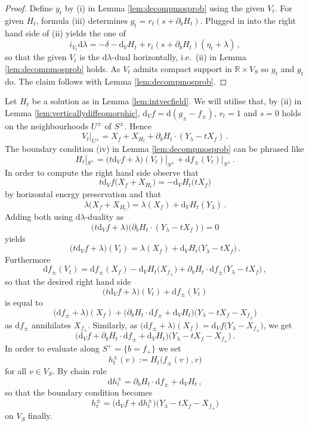 \documentclass{amsart}
\theoremstyle{definition}
\newcommand{\rmd}{\mathrm d}
\newcommand{\R}{\mathbb R}
\begin{document}
\begin{proof}
  Define $y_t$ by (i) in Lemma \ref{lem:decompmosprob}
  using the given $V_t$.
  For given $H_t$,
  formula (iii) determines $g_t=r_t(s+\partial_bH_t)$.
  Plugged in into the right hand side of (ii) yields
  the one of
  \[
    i_{V_t}\rmd\lambda=
    -\delta-\rmd_V\!H_t+r_t(s+\partial_bH_t)(\eta_t+\lambda)
    \,,
  \]
  so that the given $V_t$ is the $\rmd\lambda$-dual horizontally,
  i.e.\ (ii) in Lemma \ref{lem:decompmosprob} holds.
  As $V_t$ admits compact support in $\R\times V_S$
  so $y_t$ and $g_t$ do.
  The claim follows with Lemma \ref{lem:decompmosprob}.
\end{proof}


Let $H_t$ be a solution as in Lemma \ref{lem:intvecfield}.
We will utilise that, by (ii) in Lemma \ref{lem:verticallydiffeomorphic},
$\rmd_V\!f=\rmd(g_{\pm}-f_{\pm})$, $r_t=1$ and $s=0$ holds
on the neighbourhoods $U^{\pm}\!$ of $S^{\pm}$.
Hence
  \[
    V_t|_{U^{\pm}}=
    X_f+
    X_{H_t}+
    \partial_bH_t\cdot(Y_{\lambda}-tX_f)
    \,.
  \]
The boundary condition (iv) in Lemma \ref{lem:decompmosprob}
can be phrased like
  \[
    H_t|_{S^{\pm}}=
    \big(t\rmd_V\!f+\lambda\big)(V_t)|_{S^{\pm}}+
    \rmd f_{\pm}(V_t)|_{S^{\pm}}
    \,.
  \]
In order to compute the right hand side observe that
  \[
    t\rmd_V\!f
    \big(X_f+X_{H_t}\big)=
    -\rmd_V\!H_t\big(tX_f\big)
  \]
by horizontal energy preservation and that
  \[
    \lambda
    \big(X_f+X_{H_t}\big)=
    \lambda(X_f)+
    \rmd_V\!H_t(Y_{\lambda})
    \,.
  \]
Adding both using $\rmd\lambda$-duality as
  \[
    \big(t\rmd_V\!f+\lambda\big)
    \big(\partial_bH_t\cdot(Y_{\lambda}-tX_f)\big)
    =0
  \]
yields
  \[
    \big(t\rmd_V\!f+\lambda\big)(V_t)=
    \lambda(X_f)+\rmd_V\!H_t\big(Y_{\lambda}-tX_f\big)
    \,.
  \]
Furthermore
  \[
    \rmd f_{\pm}(V_t)=
    \rmd f_{\pm}(X_f)-
    \rmd_V\!H_t\big(X_{f_{\pm}}\big)+
    \partial_bH_t\cdot\rmd f_{\pm}\big(Y_{\lambda}-tX_f\big)
    \,,
  \]
so that the desired right hand side
  \[
    \big(t\rmd_V\!f+\lambda\big)(V_t)+
    \rmd f_{\pm}(V_t)
  \]
is equal to
  \[
    \big(\rmd f_{\pm}+\lambda\big)(X_f)+
    \big(\partial_bH_t\cdot\rmd f_{\pm}+\rmd_V\!H_t\big)
    \big(Y_{\lambda}-tX_f-X_{f_{\pm}}\big)
  \]
as $\rmd f_{\pm}$ annihilates $X_{f_{\pm}}$.
Similarly, as
$\big(\rmd f_{\pm}+\lambda\big)(X_f)=
\rmd_V\!f\big(Y_{\lambda}-X_{f_{\pm}}\big)$,
we get
  \[
    \big(\rmd_V\!f+\partial_bH_t\cdot\rmd f_{\pm}+\rmd_V\!H_t\big)
    \big(Y_{\lambda}-tX_f-X_{f_{\pm}}\big)
    \,.
  \]
In order to evaluate along $S^+=\{b=f_+\}$ we set
  \[
    h_t^{\pm}(v):=H_t\big(f_{\pm}(v),v\big)
  \]
for all $v\in V_S$.
By chain rule
  \[
    \rmd h_t^{\pm}=\partial_bH_t\cdot\rmd f_{\pm}+\rmd_V\!H_t
    \,,
  \]
so that the boundary condition becomes
  \[
    h_t^{\pm}=
    \big(\rmd_V\!f+\rmd h_t^{\pm}\big)
    \big(Y_{\lambda}-tX_f-X_{f_{\pm}}\big)
  \]
on $V_S$ finally.
\end{document}
